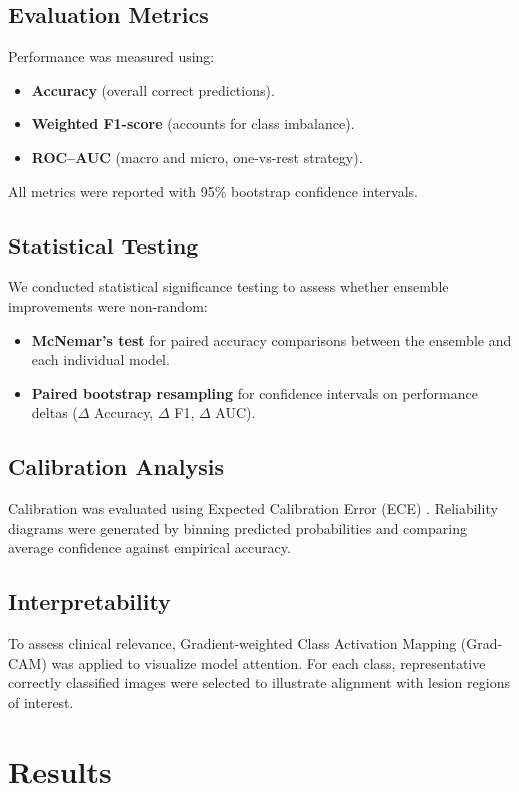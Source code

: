 \documentclass[preprint,12pt]{elsarticle}
\begin{document}
\subsection{Evaluation Metrics}
Performance was measured using:
\begin{itemize}[leftmargin=*]
  \item \textbf{Accuracy} (overall correct predictions).
  \item \textbf{Weighted F1-score} (accounts for class imbalance).
  \item \textbf{ROC--AUC} (macro and micro, one-vs-rest strategy).
\end{itemize}
All metrics were reported with 95\% bootstrap confidence intervals.

\subsection{Statistical Testing}
We conducted statistical significance testing to assess whether ensemble improvements were non-random:
\begin{itemize}[leftmargin=*]
  \item \textbf{McNemar’s test} \citet{mcnemar1947note} for paired accuracy comparisons between the ensemble and each individual model.
  \item \textbf{Paired bootstrap resampling} for confidence intervals on performance deltas ($\Delta$ Accuracy, $\Delta$ F1, $\Delta$ AUC).
\end{itemize}

\subsection{Calibration Analysis}
Calibration was evaluated using Expected Calibration Error (ECE) \cite{guo2017calibration}. Reliability diagrams were generated by binning predicted probabilities and comparing average confidence against empirical accuracy.

\subsection{Interpretability}
To assess clinical relevance, Gradient-weighted Class Activation Mapping (Grad-CAM) \cite{selvaraju2017gradcam} was applied to visualize model attention. For each class, representative correctly classified images were selected to illustrate alignment with lesion regions of interest.

\section{Results}
\end{document}

